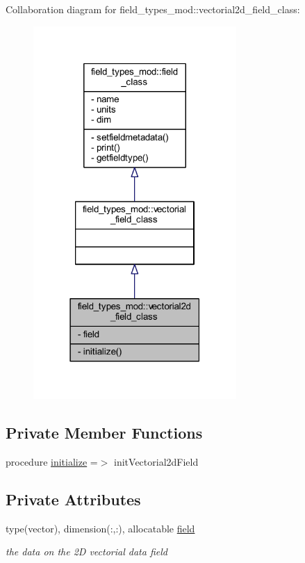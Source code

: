 Collaboration diagram for field\+\_\+types\+\_\+mod\+:\+:vectorial2d\+\_\+field\+\_\+class\+:
\nopagebreak
\begin{figure}[H]
\begin{center}
\leavevmode
\includegraphics[width=219pt]{structfield__types__mod_1_1vectorial2d__field__class__coll__graph}
\end{center}
\end{figure}
\subsection*{Private Member Functions}
\begin{DoxyCompactItemize}
\item 
procedure \mbox{\hyperlink{structfield__types__mod_1_1vectorial2d__field__class_a980cf1e337727f794dccb411d5cd7413}{initialize}} =$>$ init\+Vectorial2d\+Field
\end{DoxyCompactItemize}
\subsection*{Private Attributes}
\begin{DoxyCompactItemize}
\item 
type(vector), dimension(\+:,\+:), allocatable \mbox{\hyperlink{structfield__types__mod_1_1vectorial2d__field__class_a542737e420815a5aecccd6edc939522b}{field}}
\begin{DoxyCompactList}\small\item\em the data on the 2D vectorial data field \end{DoxyCompactList}\end{DoxyCompactItemize}


